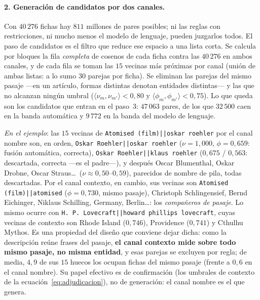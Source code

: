 \documentclass[11pt,a4paper]{article}
\begin{document}
\paragraph{2. Generación de candidatos por dos canales.}
Con $40\,276$ fichas hay $811$ millones de pares posibles; ni las reglas
con restricciones, ni mucho menos el modelo de lenguaje, pueden juzgarlos
todos. El paso de candidatos es el filtro que reduce ese espacio a una
lista corta. Se calcula por bloques la fila \emph{completa} de cosenos de
cada ficha contra las $40\,276$ en ambos canales, y de cada fila se toman
las $15$ vecinas más próximas por canal (unión de ambas listas: a lo sumo
$30$ parejas por ficha). Se eliminan las parejas del mismo pasaje ---en un
artículo, formas distintas denotan entidades distintas--- y las que no
alcanzan ningún umbral ($\langle\nu_m,\nu_{m'}\rangle < 0{,}80$ y
$\langle\phi_m,\phi_{m'}\rangle < 0{,}75$). Lo que queda son los
candidatos que entran en el paso~3: $47\,063$ pares, de los que $32\,500$
caen en la banda automática y $9\,772$ en la banda del modelo de lenguaje.

\emph{En el ejemplo}: las $15$ vecinas de \texttt{Atomised (film)||oskar
roehler} por el canal nombre son, en orden, \texttt{Oskar Roehler||oskar
roehler} ($\nu = 1{,}000$, $\phi = 0{,}659$: fusión automática, correcta),
\texttt{Oskar Roehler||klaus roehler} ($0{,}675$ / $0{,}563$: descartada,
correcta ---es el padre---), y después Oscar Blumenthal, Oskar Drobne,
Oscar Straus\dots\ ($\nu \approx 0{,}50$--$0{,}59$), parecidos de nombre de
pila, todas descartadas. Por el canal contexto, en cambio, sus vecinas son
\texttt{Atomised (film)||atomised} ($\phi = 0{,}730$, mismo pasaje),
Christoph Schlingensief, Bernd Eichinger, Niklaus Schilling, Germany,
Berlin\dots: los \emph{compañeros de pasaje}. Lo mismo ocurre con
\texttt{H. P. Lovecraft||howard phillips lovecraft}, cuyas vecinas de
contexto son Rhode Island ($0{,}746$), Providence ($0{,}741$) y Cthulhu
Mythos. Es una propiedad del diseño que conviene dejar dicha: como la
descripción reúne frases del pasaje, \textbf{el canal contexto mide sobre
todo \guillemotleft{}mismo pasaje\guillemotright{}, no \guillemotleft{}misma entidad\guillemotright{}}, y esas parejas se excluyen por
regla; de media, $4{,}9$ de sus $15$ huecos los ocupan fichas del mismo
pasaje (frente a $0{,}6$ en el canal nombre). Su papel efectivo es de
confirmación (los umbrales de contexto de la ecuación~\ref{eq:adjudicacion}),
no de generación: el canal nombre es el que genera.
\end{document}
